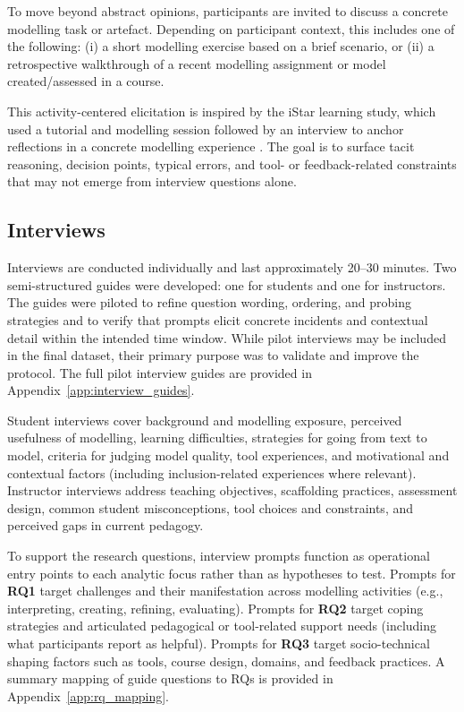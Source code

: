 To move beyond abstract opinions, participants are invited to discuss a concrete modelling task or artefact. Depending on participant context, this includes one of the following:
(i) a short modelling exercise based on a brief scenario, or
(ii) a retrospective walkthrough of a recent modelling assignment or model created/assessed in a course.

This activity-centered elicitation is inspired by the iStar learning study, which used a tutorial and modelling session followed by an interview to anchor reflections in a concrete modelling experience \cite{istar-learning}. The goal is to surface tacit reasoning, decision points, typical errors, and tool- or feedback-related constraints that may not emerge from interview questions alone.

\subsection{Interviews}
\label{subsec:method_interviews}

Interviews are conducted individually and last approximately 20--30 minutes. Two semi-structured guides were developed: one for students and one for instructors. The guides were piloted to refine question wording, ordering, and probing strategies and to verify that prompts elicit concrete incidents and contextual detail within the intended time window. While pilot interviews may be included in the final dataset, their primary purpose was to validate and improve the protocol. The full pilot interview guides are provided in Appendix~\ref{app:interview_guides}.

Student interviews cover background and modelling exposure, perceived usefulness of modelling, learning difficulties, strategies for going from text to model, criteria for judging model quality, tool experiences, and motivational and contextual factors (including inclusion-related experiences where relevant). Instructor interviews address teaching objectives, scaffolding practices, assessment design, common student misconceptions, tool choices and constraints, and perceived gaps in current pedagogy.

To support the research questions, interview prompts function as operational entry points to each analytic focus rather than as hypotheses to test. Prompts for \textbf{RQ1} target challenges and their manifestation across modelling activities (e.g., interpreting, creating, refining, evaluating). Prompts for \textbf{RQ2} target coping strategies and articulated pedagogical or tool-related support needs (including what participants report as helpful). Prompts for \textbf{RQ3} target socio-technical shaping factors such as tools, course design, domains, and feedback practices. A summary mapping of guide questions to RQs is provided in Appendix~\ref{app:rq_mapping}.

